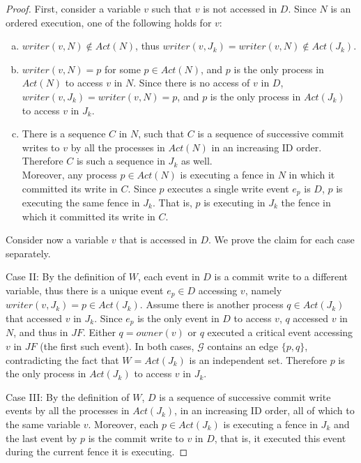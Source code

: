 \begin{proof}
	First, consider a variable $v$ such that $v$ is not accessed in $D$. Since $N$ is an ordered execution, one of the following holds for $v$:
	\begin{enumerate} [(a)]
		\item $writer(v,N) \notin Act(N)$, thus $writer(v,J_k) = writer(v,N) \notin Act(J_k)$.
		\item $writer(v,N) = p$ for some $p \in Act(N)$, and $p$ is the only process in $Act(N)$ to access $v$ in $N$. Since there is no access of $v$ in $D$, $writer(v,J_k) = writer(v,N) = p$, and $p$ is the only process in $Act(J_k)$ to access $v$ in $J_k$.
		\item There is a sequence $C$ in $N$, such that $C$ is a sequence of successive commit writes to $v$ by all the processes in $Act(N)$ in an increasing ID order. Therefore $C$ is such a sequence in $J_k$ as well.
		\\ Moreover, any process $p \in Act(N)$ is executing a fence in $N$ in which it committed its write in $C$. Since $p$ executes a single write event $e_p$ is $D$, $p$ is executing the same fence in $J_k$. That is, $p$ is executing in $J_k$ the fence in which it committed its write in $C$.
	\end{enumerate}
	Consider now a variable $v$ that is accessed in $D$. We prove the claim for each case separately.
	
	Case II: By the definition of $W$, each event in $D$ is a commit write to a different variable, thus there is a unique event $e_p \in D$ accessing $v$, namely $writer(v,J_k) = p \in Act(J_k)$. Assume there is another process $q \in Act(J_k)$ that accessed $v$ in $J_k$. Since $e_p$ is the only event in $D$ to access $v$, $q$ accessed $v$ in $N$, and thus in $J F$. Either $q = owner(v)$ or $q$ executed a critical event accessing $v$ in $J F$ (the first such event). In both cases, $\mathcal{G}$ contains an edge $\{p,q\}$, contradicting the fact that $W = Act(J_k)$ is an independent set. Therefore $p$ is the only process in $Act(J_k)$ to access $v$ in $J_k$.
	
	Case III: By the definition of $W$, $D$ is a sequence of successive commit write events by all the processes in $Act(J_k)$, in an increasing ID order, all of which to the same variable $v$. Moreover, each $p \in Act(J_k)$ is executing a fence in $J_k$ and the last event by $p$ is the commit write to $v$ in $D$, that is, it executed this event during the current fence it is executing.
\end{proof}

